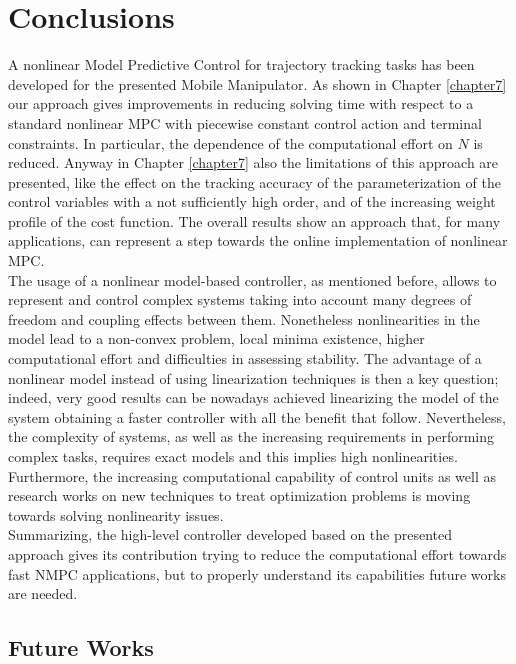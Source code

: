 
\chapter{Conclusions}
\label{conclusions}
A nonlinear Model Predictive Control for trajectory tracking tasks has been developed for the presented Mobile Manipulator. As shown in Chapter \ref{chapter7} our approach gives improvements in reducing solving time with respect to a standard nonlinear MPC with piecewise constant control action and terminal constraints. In particular, the dependence of the computational effort on $N$ is reduced. Anyway in Chapter \ref{chapter7} also the limitations of this approach are presented, like the effect on the tracking accuracy of the parameterization of the control variables with a not sufficiently high order, and of the increasing weight profile of the cost function. The overall results show an approach that, for many applications, can represent a step towards the online implementation of nonlinear MPC. \\
The usage of a nonlinear model-based controller, as mentioned before, allows to represent and control complex systems taking into account many degrees of freedom and coupling effects between them. Nonetheless nonlinearities in the model lead to a non-convex problem, local minima existence, higher computational effort and difficulties in assessing stability. The advantage of a nonlinear model instead of using linearization techniques is then a key question; indeed, very good results can be nowadays achieved linearizing the model of the system obtaining a faster controller with all the benefit that follow. Nevertheless, the complexity of systems, as well as the increasing requirements in performing complex tasks, requires exact models and this implies high nonlinearities. Furthermore, the increasing computational capability of control units as well as research works on new techniques to treat optimization problems is moving towards solving nonlinearity issues.\\
Summarizing, the high-level controller developed based on the presented approach gives its contribution trying to reduce the computational effort towards fast NMPC applications, but to properly understand its capabilities future works are needed.

\section{Future Works}

